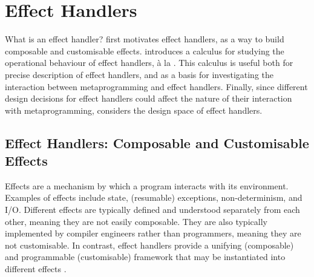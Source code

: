 \section{Effect Handlers}\label{section:effects-technical}
What is an effect handler?  first motivates effect handlers, as a way to build composable and customisable effects.  introduces a calculus for studying the operational behaviour of effect handlers, à la \citet{pretnar-15}. This calculus is useful both for precise description of effect handlers, and as a basis for investigating the interaction between metaprogramming and effect handlers. Finally, since different design decisions for effect handlers could affect the nature of their interaction with metaprogramming,  considers the design space of effect handlers.

\subsection{Effect Handlers: Composable and Customisable Effects}\label{subsection:effect-handler-motivation}
Effects are a mechanism by which a program interacts with its environment. Examples of effects include state, (resumable) exceptions, non-determinism, and I/O. Different effects are typically defined and understood separately from each other, meaning they are not easily composable. They are also typically implemented by compiler engineers rather than programmers, meaning they are not customisable. In contrast, effect handlers provide a unifying (composable) and programmable (customisable) framework that may be instantiated into different effects \citep{kiselyov-2012}.




